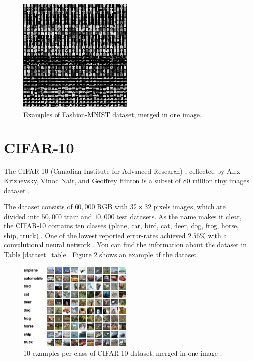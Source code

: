 \begin{figure}
  \centering
  \label{fig:fashion_mnist_dataset_example}
  \includegraphics[width=0.5\textwidth]{fig/fashion-mnist-dataset_example}
  \caption{Examples of Fashion-MNIST dataset, merged in one image.}
\end{figure}

\section{CIFAR-10}
The CIFAR-10 (Canadian Institute for Advanced Research)
, collected by Alex Krizhevsky, Vinod Nair, and Geoffrey Hinton is a subset of $80$ million tiny
images dataset \cite{CIFAR-10_origin_dataset}.

The dataset consists of $60,000$  RGB with $32 \times 32$ pixels images, which are divided into $50,000$ train and $10,000$ test datasets. As the name makes it clear, the CIFAR-10 contains ten classes (plane, car, bird, cat, deer, dog, frog, horse, ship, truck) \cite{CIFAR-10_dataset_reference}.
One of the lowest reported error-rates achieved $2.56\%$ with a convolutional neural network \cite{CIFAR-10_best_result_reference}. You can
find the information about the dataset in Table
\ref{dataset_table}. Figure \ref{fig:cifar-10_dataset_example} shows an example of the dataset.

\begin{figure}
  \centering
  \label{fig:cifar-10_dataset_example}
  \includegraphics[width=0.5\textwidth]{fig/cifar-10}
  \caption{10 examples per class of CIFAR-10 dataset, merged in one image \cite{CIFAR-10_dataset_reference}.}
\end{figure}




